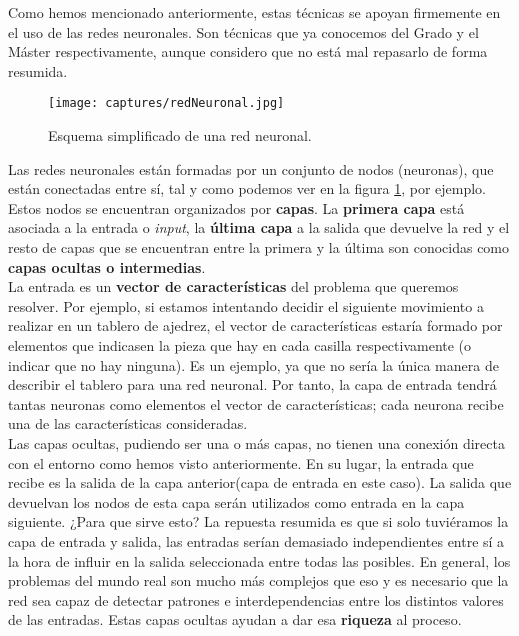 \documentclass[11pt,fleqn]{book} %
\begin{document}
Como hemos mencionado anteriormente, estas técnicas se apoyan firmemente en el uso de las redes neuronales. Son técnicas que ya conocemos del Grado y el Máster respectivamente, aunque considero que no está mal repasarlo de forma resumida. \cite{article:redesNeuronalesMicrosoft} \cite{book:TFGredes} \cite{book:berzal} \cite{article:redesNeuronales} \cite{article:RLromero} \\

\begin{figure}[H]
	\centering\texttt{[image: captures/redNeuronal.jpg]}
	\caption{Esquema simplificado de una red neuronal. \cite{article:redNeuronal}}
	\label{fig:redNeuronal} %
\end{figure}

Las redes neuronales están formadas por un conjunto de nodos (neuronas), que están conectadas entre sí, tal y como podemos ver en la figura \ref{fig:redNeuronal}, por ejemplo. \\

Estos nodos se encuentran organizados por \textbf{capas}. La \textbf{primera capa} está asociada a la entrada o \textit{input}, la \textbf{última capa} a la salida que devuelve la red y el resto de capas que se encuentran entre la primera y la última son conocidas como \textbf{capas ocultas o intermedias}. \\

La entrada es un \textbf{vector de características} del problema que queremos resolver. Por ejemplo, si estamos intentando decidir el siguiente movimiento a realizar en un tablero de ajedrez, el vector de características estaría formado por elementos que indicasen la pieza que hay en cada casilla respectivamente (o indicar que no hay ninguna). Es un ejemplo, ya que no sería la única manera de describir el tablero para una red neuronal. Por tanto, la capa de entrada tendrá tantas neuronas como elementos el vector de características; cada neurona recibe una de las características consideradas. \\

Las capas ocultas, pudiendo ser una o más capas, no tienen una conexión directa con el entorno como hemos visto anteriormente. En su lugar, la entrada que recibe es la salida de la capa anterior(capa de entrada en este caso). La salida que devuelvan los nodos de esta capa serán utilizados como entrada en la capa siguiente. ¿Para que sirve esto? La repuesta resumida es que si solo tuviéramos la capa de entrada y salida, las entradas serían demasiado independientes entre sí a la hora de influir en la salida seleccionada entre todas las posibles. En general, los problemas del mundo real son mucho más complejos que eso y es necesario que la red sea capaz de detectar patrones e interdependencias entre los distintos valores de las entradas. Estas capas ocultas ayudan a dar esa \textbf{riqueza} al proceso.\cite{article:redNeuronal2}\\
\end{document}
